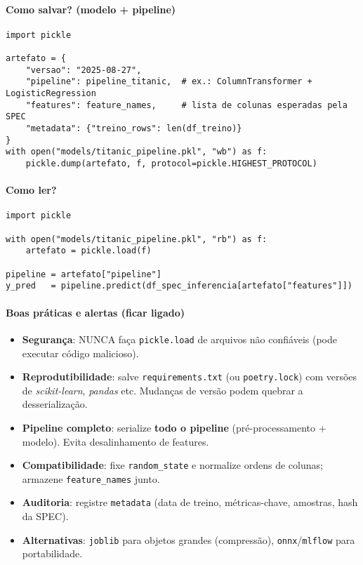 \documentclass[12pt,a4paper]{article}
\begin{document}
\paragraph{Como salvar? (modelo + pipeline)}
\begin{verbatim}
import pickle

artefato = {
    "versao": "2025-08-27",
    "pipeline": pipeline_titanic,  # ex.: ColumnTransformer + LogisticRegression
    "features": feature_names,     # lista de colunas esperadas pela SPEC
    "metadata": {"treino_rows": len(df_treino)}
}
with open("models/titanic_pipeline.pkl", "wb") as f:
    pickle.dump(artefato, f, protocol=pickle.HIGHEST_PROTOCOL)
\end{verbatim}

\paragraph{Como ler?}
\begin{verbatim}
import pickle

with open("models/titanic_pipeline.pkl", "rb") as f:
    artefato = pickle.load(f)

pipeline = artefato["pipeline"]
y_pred   = pipeline.predict(df_spec_inferencia[artefato["features"]])
\end{verbatim}

\paragraph{Boas práticas e alertas (ficar ligado)}
\begin{itemize}
  \item \textbf{Segurança}: NUNCA faça \texttt{pickle.load} de arquivos não confiáveis (pode executar código malicioso).
  \item \textbf{Reprodutibilidade}: salve \texttt{requirements.txt} (ou \texttt{poetry.lock}) com versões de \textit{scikit-learn}, \textit{pandas} etc. Mudanças de versão podem quebrar a desserialização.
  \item \textbf{Pipeline completo}: serialize \textbf{todo o pipeline} (pré-processamento + modelo). Evita desalinhamento de features.
  \item \textbf{Compatibilidade}: fixe \texttt{random\_state} e normalize ordens de colunas; armazene \texttt{feature\_names} junto.
  \item \textbf{Auditoria}: registre \texttt{metadata} (data de treino, métricas-chave, amostras, hash da SPEC).
  \item \textbf{Alternativas}: \texttt{joblib} para objetos grandes (compressão), \texttt{onnx}/\texttt{mlflow} para portabilidade.
\end{itemize}
\end{document}
